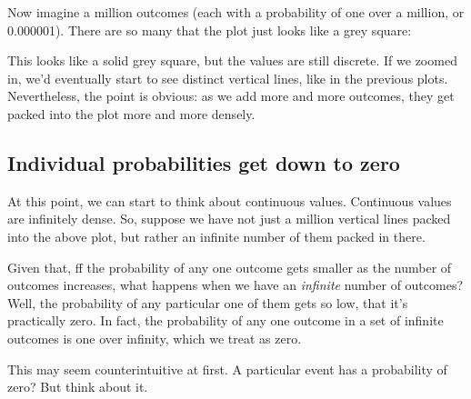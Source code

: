 \documentclass[../../../main.tex]{subfiles}
\begin{document}
Now imagine a million outcomes (each with a probability of one over a million, or 0.000001). There are so many that the plot just looks like a grey square:

\begin{center}
\end{center}

\noindent
This looks like a solid grey square, but the values are still discrete. If we zoomed in, we'd eventually start to see distinct vertical lines, like in the previous plots. Nevertheless, the point is obvious: as we add more and more outcomes, they get packed into the plot more and more densely.


\subsection{Individual probabilities get down to zero}

At this point, we can start to think about continuous values. Continuous values are infinitely dense. So, suppose we have not just a million vertical lines packed into the above plot, but rather an infinite number of them packed in there. 

Given that, ff the probability of any one outcome gets smaller as the number of outcomes increases, what happens when we have an \emph{infinite} number of outcomes? Well, the probability of any particular one of them gets so low, that it's practically zero. In fact, the probability of any one outcome in a set of infinite outcomes is one over infinity, which we treat as zero.
 
This may seem counterintuitive at first. A particular event has a probability of zero? But think about it. 
\end{document}
